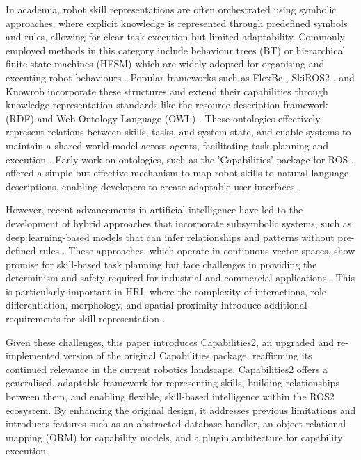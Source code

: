 \documentclass[conference]{IEEEtran}
\begin{document}
In academia, robot skill representations are often orchestrated using symbolic approaches, where explicit knowledge is represented through predefined symbols and rules, allowing for clear task execution but limited adaptability. Commonly employed methods in this category include behaviour trees (BT) or hierarchical finite state machines (HFSM) which are widely adopted for organising and executing robot behaviours \cite{colledanchise2021implementation, ghzouli2023behavior}. Popular frameworks such as FlexBe \cite{schillinger2016human}, SkiROS2 \cite{mayr2023skiros2}, and Knowrob \cite{tenorth2009knowrob} incorporate these structures and extend their capabilities through knowledge representation standards like the resource description framework (RDF) \cite{mayr2023skiros2} and Web Ontology Language (OWL) \cite{van2004owl, pantano2022capability}. These ontologies effectively represent relations between skills, tasks, and system state, and enable systems to maintain a shared world model across agents, facilitating task planning and execution \cite{rovida2017skiros}. Early work on ontologies, such as the 'Capabilities' package for ROS \cite{woodall2014ros}, offered a simple but effective mechanism to map robot skills to natural language descriptions, enabling developers to create adaptable user interfaces.

However, recent advancements in artificial intelligence have led to the development of hybrid approaches that incorporate subsymbolic systems, such as deep learning-based models that can infer relationships and patterns without pre-defined rules \cite{ahmad2023learning, chen2024language, mayr2022skill}. These approaches, which operate in continuous vector spaces, show promise for skill-based task planning but face challenges in providing the determinism and safety required for industrial and commercial applications \cite{lecun2015deep}. This is particularly important in HRI, where the complexity of interactions, role differentiation, morphology, and spatial proximity introduce additional requirements for skill representation \cite{yanco2004classifying}.

Given these challenges, this paper introduces Capabilities2, an upgraded and re-implemented version of the original Capabilities package, reaffirming its continued relevance in the current robotics landscape. Capabilities2 offers a generalised, adaptable framework for representing skills, building relationships between them, and enabling flexible, skill-based intelligence within the ROS2 ecosystem. By enhancing the original design, it addresses previous limitations and introduces features such as an abstracted database handler, an object-relational mapping (ORM) for capability models, and a plugin architecture for capability execution.
\end{document}
